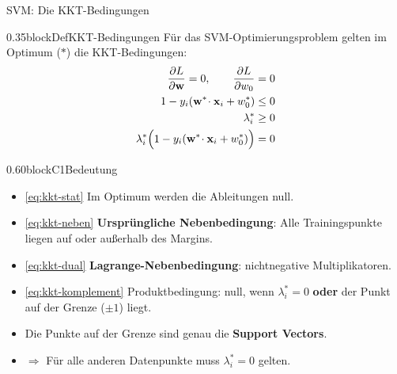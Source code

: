 \begin{frame}{SVM: Die KKT-Bedingungen}
\footnotesize

\begin{blockrow}
  \begin{blockcol}{0.35\textwidth}{blockDef}{\footnotesize KKT-Bedingungen}
Für das SVM-Optimierungsproblem gelten im Optimum ($*$) die KKT-Bedingungen:
\setcounter{equation}{0}
\begin{align}
  \frac{\partial L}{\partial \mathbf{w}} = 0, \qquad
  \frac{\partial L}{\partial w_0} &= 0 \label{eq:kkt-stat}\\
  1 - y_i(\mathbf{w}^{*}\!\cdot\mathbf{x}_i + w_0^{*}) &\leq 0 \label{eq:kkt-neben}\\
  \lambda_i^{*} &\geq 0 \label{eq:kkt-dual}\\
  \lambda_i^{*}\Bigl(1 - y_i(\mathbf{w}^{*}\!\cdot\mathbf{x}_i + w_0^{*})\Bigr) &= 0
    \label{eq:kkt-komplement}
\end{align}
  \end{blockcol}
  \begin{blockcol}{0.60\textwidth}{blockC1}{\footnotesize Bedeutung}
\begin{itemize}
  \item \eqref{eq:kkt-stat} Im Optimum werden die Ableitungen null.
  \item \eqref{eq:kkt-neben} \textbf{Ursprüngliche Nebenbedingung}: Alle Trainingspunkte liegen auf oder außerhalb des Margins.
  \item \eqref{eq:kkt-dual} \textbf{Lagrange-Nebenbedingung}: nichtnegative Multiplikatoren.
  \item \eqref{eq:kkt-komplement} Produktbedingung: null, wenn $\lambda_i^{*} = 0$ \textbf{oder} der Punkt auf der Grenze ($\pm 1$) liegt.
  \item Die Punkte auf der Grenze sind genau die \textbf{Support Vectors}.
  \item $\Rightarrow$ Für alle anderen Datenpunkte muss $\lambda_i^{*} = 0$ gelten.
\end{itemize}
  \end{blockcol}
\end{blockrow}
\end{frame}





